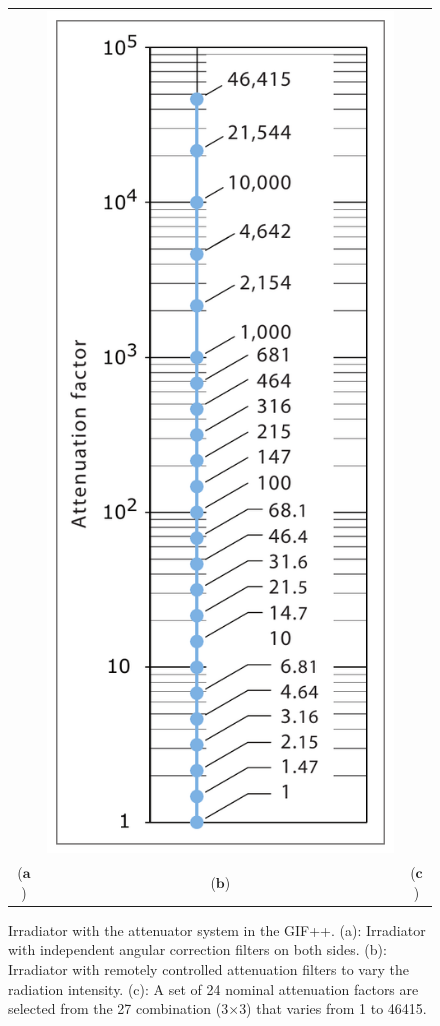 \begin{figure}[htp]
\begin{tabular}{ccc}
& \hspace{-0.65cm} \includegraphics[scale=0.439]{fig/wincc/filter_factors.pdf}\\
  \qquad ($\mathbf{a}$)\qquad\qquad&($\mathbf{b}$)\qquad\qquad&($\mathbf{c}$)\\
\end{tabular}
\caption{Irradiator with the attenuator system in the GIF++. (a): Irradiator with independent angular correction filters on both sides. (b): Irradiator with remotely controlled attenuation filters to vary the radiation intensity. (c): A set of 24 nominal attenuation factors are selected from the 27 combination (3$\times$3) that varies from 1 to 46415.}\label{fig:attenuator_gif}
\end{figure}

